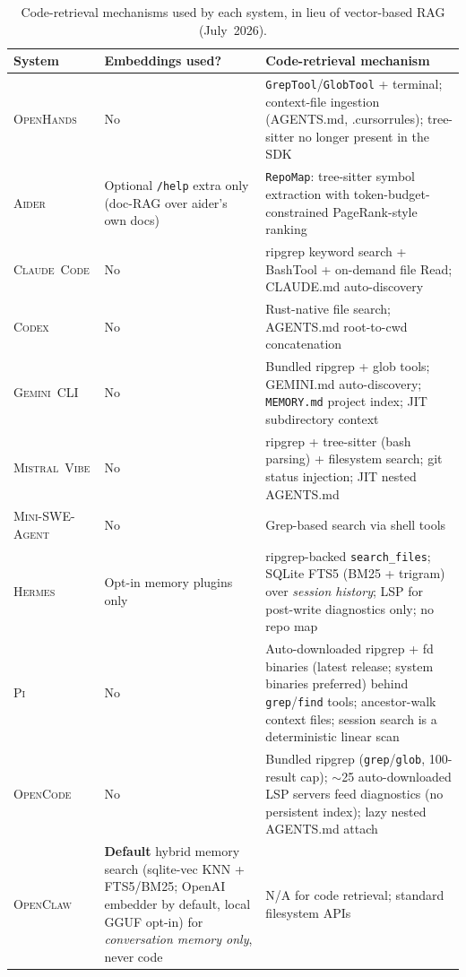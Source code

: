\documentclass[11pt,a4paper]{article}
\newcommand{\clcode}{\textsc{Claude~Code}\xspace}
\newcommand{\cdx}{\textsc{Codex}\xspace}
\newcommand{\oh}{\textsc{OpenHands}\xspace}
\newcommand{\adr}{\textsc{Aider}\xspace}
\newcommand{\mswe}{\textsc{Mini-SWE-Agent}\xspace}
\newcommand{\ocl}{\textsc{OpenClaw}\xspace}
\newcommand{\vibe}{\textsc{Mistral~Vibe}\xspace}
\newcommand{\gemini}{\textsc{Gemini~CLI}\xspace}
\newcommand{\hrm}{\textsc{Hermes}\xspace}
\newcommand{\pib}{\textsc{Pi}\xspace}
\newcommand{\ocd}{\textsc{OpenCode}\xspace}
\begin{document}
\begin{table}[H]
\centering
\caption{Code-retrieval mechanisms used by each system, in lieu of vector-based RAG (July~2026).}
\label{tab:retrieval}
\small
\renewcommand{\arraystretch}{1.2}
\begin{tabularx}{\textwidth}{@{}l L{3.2cm} L{7.8cm}@{}}
\toprule
\textbf{System} & \textbf{Embeddings used?} & \textbf{Code-retrieval mechanism} \\
\midrule
\oh{}     & No & \texttt{GrepTool}/\texttt{GlobTool} + terminal; context-file ingestion (AGENTS.md, .cursorrules); tree-sitter no longer present in the SDK \\
\adr{}    & Optional \texttt{/help} extra only (doc-RAG over aider's own docs) & \texttt{RepoMap}: tree-sitter symbol extraction with token-budget-constrained PageRank-style ranking \\
\clcode{} & No & ripgrep keyword search + BashTool + on-demand file Read; CLAUDE.md auto-discovery \\
\cdx{}    & No & Rust-native file search; AGENTS.md root-to-cwd concatenation \\
\gemini{} & No & Bundled ripgrep + glob tools; GEMINI.md auto-discovery; \texttt{MEMORY.md} project index; JIT subdirectory context \\
\vibe{}   & No & ripgrep + tree-sitter (bash parsing) + filesystem search; git status injection; JIT nested AGENTS.md \\
\mswe{}   & No & Grep-based search via shell tools \\
\hrm{}    & Opt-in memory plugins only & ripgrep-backed \texttt{search\_files}; SQLite FTS5 (BM25 + trigram) over \emph{session history}; LSP for post-write diagnostics only; no repo map \\
\pib{}    & No & Auto-downloaded ripgrep + fd binaries (latest release; system binaries preferred) behind \texttt{grep}/\texttt{find} tools; ancestor-walk context files; session search is a deterministic linear scan \\
\ocd{}    & No & Bundled ripgrep (\texttt{grep}/\texttt{glob}, 100-result cap); $\sim$25 auto-downloaded LSP servers feed diagnostics (no persistent index); lazy nested AGENTS.md attach \\
\ocl{}    & \textbf{Default} hybrid memory search (sqlite-vec KNN + FTS5/BM25; OpenAI embedder by default, local GGUF opt-in) for \emph{conversation memory only}, never code & N/A for code retrieval; standard filesystem APIs \\
\bottomrule
\end{tabularx}
\end{table}
\end{document}
